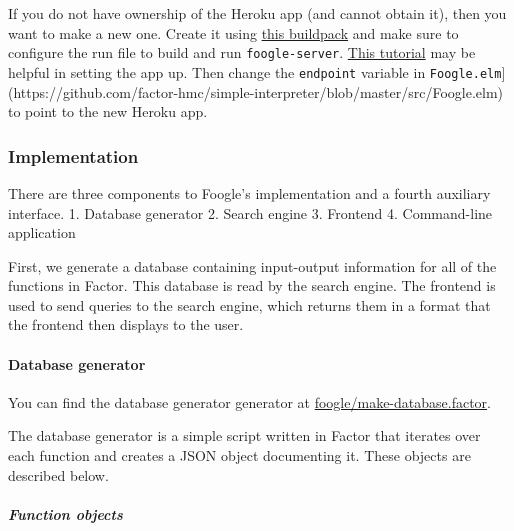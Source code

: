 \documentclass[
]{article}
\begin{document}
If you do not have ownership of the Heroku app (and cannot obtain it),
then you want to make a new one. Create it using
\href{https://github.com/mfine/heroku-buildpack-stack}{this buildpack}
and make sure to configure the run file to build and run
\texttt{foogle-server}.
\href{https://hackernoon.com/for-all-the-world-to-see-deploying-haskell-with-heroku-7ea46f827ce}{This
tutorial} may be helpful in setting the app up. Then change the
\texttt{endpoint} variable in
\texttt{Foogle.elm}{]}(https://github.com/factor-hmc/simple-interpreter/blob/master/src/Foogle.elm)
to point to the new Heroku app.

\hypertarget{implementation}{%
\subsubsection{Implementation}\label{implementation}}

There are three components to Foogle's implementation and a fourth
auxiliary interface. 1. Database generator 2. Search engine 3. Frontend
4. Command-line application

First, we generate a database containing input-output information for
all of the functions in Factor. This database is read by the search
engine. The frontend is used to send queries to the search engine, which
returns them in a format that the frontend then displays to the user.

\hypertarget{database-generator}{%
\paragraph{Database generator}\label{database-generator}}

You can find the database generator generator at
\href{https://github.com/factor-hmc/foogle/blob/master/make-database.factor}{foogle/make-database.factor}.

The database generator is a simple script written in Factor that
iterates over each function and creates a JSON object documenting it.
These objects are described below.

\hypertarget{function-objects}{%
\subparagraph{Function objects}\label{function-objects}}
\end{document}
